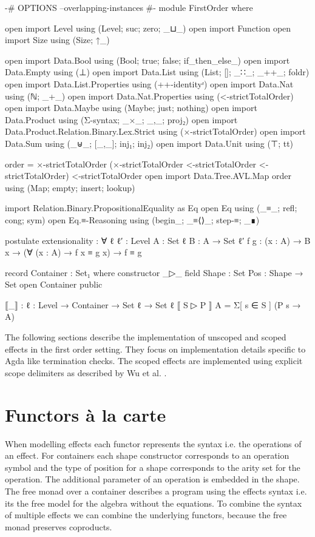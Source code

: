 \begin{code}[hide]
{-# OPTIONS --overlapping-instances #-}
module FirstOrder where

open import Level using (Level; suc; zero; _⊔_)
open import Function
open import Size using (Size; ↑_)

open import Data.Bool using (Bool; true; false; if_then_else_)
open import Data.Empty using (⊥)
open import Data.List using (List; []; _∷_; _++_; foldr)
open import Data.List.Properties using (++-identityʳ)
open import Data.Nat using (ℕ; _+_)
open import Data.Nat.Properties using (<-strictTotalOrder)
open import Data.Maybe using (Maybe; just; nothing)
open import Data.Product using (Σ-syntax; _×_; _,_; proj₂)
open import Data.Product.Relation.Binary.Lex.Strict using (×-strictTotalOrder)
open import Data.Sum using (_⊎_; [_,_]; inj₁; inj₂)
open import Data.Unit using (⊤; tt)

order = ×-strictTotalOrder (×-strictTotalOrder <-strictTotalOrder <-strictTotalOrder) <-strictTotalOrder
open import Data.Tree.AVL.Map order using (Map; empty; insert; lookup)

import Relation.Binary.PropositionalEquality as Eq
open Eq using (_≡_; refl; cong; sym)
open Eq.≡-Reasoning using (begin_; _≡⟨⟩_; step-≡; _∎)

postulate
  extensionality : ∀ {ℓ ℓ′ : Level} {A : Set ℓ} {B : A → Set ℓ′} {f g : (x : A) → B x}
      → (∀ (x : A) → f x ≡ g x) → f ≡ g

record Container : Set₁ where
  constructor _▷_
  field
    Shape : Set
    Pos : Shape → Set
open Container public

⟦_⟧ : {ℓ : Level} → Container → Set ℓ → Set ℓ
⟦ S ▷ P ⟧ A = Σ[ s ∈ S ] (P s → A)
\end{code}

The following sections describe the implementation of unscoped and scoped
effects in the first order setting.
They focus on implementation details specific to Agda like termination checks.
The scoped effects are implemented using explicit scope delimiters as described
by Wu et al. \cite{DBLP:conf/haskell/WuSH14}.


\section{Functors {\`{a}} la carte}
\label{first-order:functor}

When modelling effects each functor represents the syntax i.e. the operations of
an effect.
For containers each shape constructor corresponds to an operation symbol and the
type of position for a shape corresponds to the arity set for the operation.
The additional parameter of an operation is embedded in the shape.
The free monad over a container describes a program using the effects syntax
i.e. its the free model for the algebra without the equations.
To combine the syntax of multiple effects we can combine the underlying
functors, because the free monad preserves coproducts.

